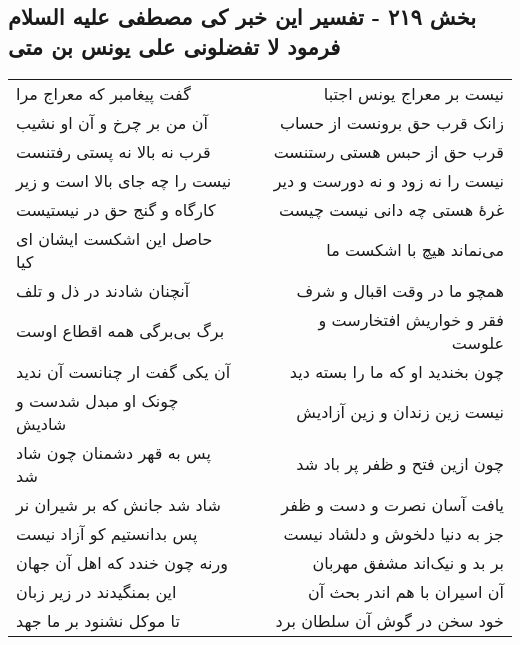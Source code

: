 \begin{center}
\section*{بخش ۲۱۹ - تفسیر این خبر کی مصطفی علیه السلام فرمود لا تفضلونی علی یونس بن متی}
\label{sec:sh219}
\begin{longtable}{l p{0.5cm} r}
گفت پیغامبر که معراج مرا
&&
نیست بر معراج یونس اجتبا
\\
آن من بر چرخ و آن او نشیب
&&
زانک قرب حق برونست از حساب
\\
قرب نه بالا نه پستی رفتنست
&&
قرب حق از حبس هستی رستنست
\\
نیست را چه جای بالا است و زیر
&&
نیست را نه زود و نه دورست و دیر
\\
کارگاه و گنج حق در نیستیست
&&
غرهٔ هستی چه دانی نیست چیست
\\
حاصل این اشکست ایشان ای کیا
&&
می‌نماند هیچ با اشکست ما
\\
آنچنان شادند در ذل و تلف
&&
همچو ما در وقت اقبال و شرف
\\
برگ بی‌برگی همه اقطاع اوست
&&
فقر و خواریش افتخارست و علوست
\\
آن یکی گفت ار چنانست آن ندید
&&
چون بخندید او که ما را بسته دید
\\
چونک او مبدل شدست و شادیش
&&
نیست زین زندان و زین آزادیش
\\
پس به قهر دشمنان چون شاد شد
&&
چون ازین فتح و ظفر پر باد شد
\\
شاد شد جانش که بر شیران نر
&&
یافت آسان نصرت و دست و ظفر
\\
پس بدانستیم کو آزاد نیست
&&
جز به دنیا دلخوش و دلشاد نیست
\\
ورنه چون خندد که اهل آن جهان
&&
بر بد و نیک‌اند مشفق مهربان
\\
این بمنگیدند در زیر زبان
&&
آن اسیران با هم اندر بحث آن
\\
تا موکل نشنود بر ما جهد
&&
خود سخن در گوش آن سلطان برد
\\
\end{longtable}
\end{center}
